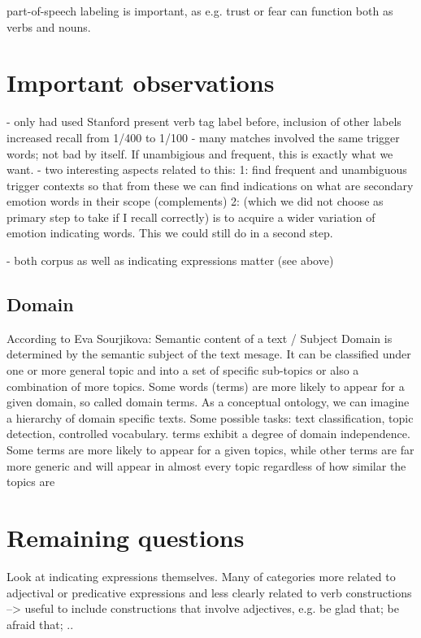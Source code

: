 part-of-speech labeling is important, as e.g. trust or fear can function both as verbs and nouns.


\section{Important observations}

- only had used Stanford present verb tag label before, inclusion of other labels increased recall from 1/400 to 1/100
- many matches involved the same trigger words; not bad by itself. If unambigious and frequent, this is exactly what we want.
- two interesting aspects related to this:
1: find frequent and unambiguous trigger contexts so that from these we can find indications on what are secondary emotion words in their scope (complements)
2: (which we did not choose as primary step to take if I recall correctly) is to acquire a wider variation of emotion indicating words. This we could still do in a second step.

- both corpus as well as indicating expressions matter (see above)

\subsection{Domain}

According to Eva Sourjikova:
Semantic content of a text / Subject
Domain is determined by the semantic subject of the text mesage. It can be classified under one
or more general topic and into a set of specific sub-topics or also a combination of more topics.
Some words (terms) are more likely to appear for a given domain, so called domain terms. As
a conceptual ontology, we can imagine a hierarchy of domain specific texts. Some possible tasks:
text classification, topic detection, controlled vocabulary. terms exhibit a degree of domain independence. Some terms are more likely to appear for a given topics, while other terms are far more
generic and will appear in almost every topic regardless of how similar the topics are

\section{Remaining questions}

Look at indicating expressions themselves.
Many of categories more related to adjectival or predicative expressions and less clearly related to verb constructions
--> useful to include constructions that involve adjectives, e.g. be glad that; be afraid that; ..

